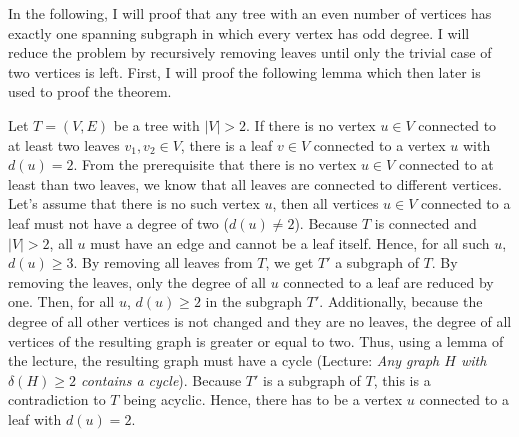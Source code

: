 \documentclass[a4paper]{article}
\begin{document}
	\begin{solution}{6}
		In the following, I will proof that any tree with an even number of vertices has exactly one spanning subgraph in which every vertex has odd degree. 
		I will reduce the problem by recursively removing leaves until only the trivial case of two vertices is left. 
		First, I will proof the following lemma which then later is used to proof the theorem. 
			
		\begin{lemma}{Let $T=(V,E)$ be a tree with $|V|>2$. If there is no vertex $u \in V$ connected to at least two leaves $v_1, v_2 \in V$, there is a leaf $v \in V$ connected to a vertex $u$ with $d(u) = 2$.}
			From the prerequisite that there is no vertex $u \in V$ connected to at least than two leaves, we know that all leaves are connected to different vertices. 
			Let's assume that there is no such vertex $u$, then all vertices $u \in V$ connected to a leaf must not have a degree of two ($d(u) \neq 2$). 
			Because $T$ is connected and $|V|>2$, all $u$ must have an edge and cannot be a leaf itself. Hence, for all such $u$, $d(u) \geq 3$. 
			By removing all leaves from $T$, we get $T'$ a subgraph of $T$. By removing the leaves, only the degree of all $u$ connected to a leaf are reduced by one. 
			Then, for all $u$, $d(u) \geq 2$ in the subgraph $T'$. 
			Additionally, because the degree of all other vertices is not changed and they are no leaves, the degree of all vertices of the resulting graph is greater or equal to two. 
			Thus, using a lemma of the lecture, the resulting graph must have a cycle (Lecture: \emph{Any graph $H$ with $\delta(H) \geq 2$ contains a cycle}). 
			Because $T'$ is a subgraph of $T$, this is a contradiction to $T$ being acyclic. Hence, there has to be a vertex $u$ connected to a leaf with $d(u)=2$. 		
		\end{lemma}
					

\end{solution}
\end{document}
